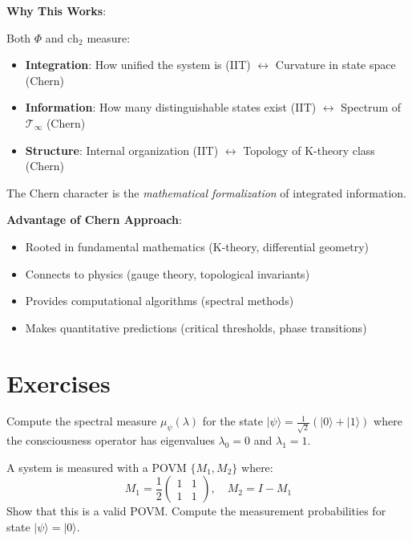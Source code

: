 \begin{level2}
\textbf{Why This Works}:

Both $\Phi$ and $\text{ch}_2$ measure:
\begin{itemize}
\item \textbf{Integration}: How unified the system is (IIT) $\leftrightarrow$ Curvature in state space (Chern)
\item \textbf{Information}: How many distinguishable states exist (IIT) $\leftrightarrow$ Spectrum of $\mathcal{T}_\infty$ (Chern)
\item \textbf{Structure}: Internal organization (IIT) $\leftrightarrow$ Topology of K-theory class (Chern)
\end{itemize}

The Chern character is the \textit{mathematical formalization} of integrated information.

\textbf{Advantage of Chern Approach}:
\begin{itemize}
\item Rooted in fundamental mathematics (K-theory, differential geometry)
\item Connects to physics (gauge theory, topological invariants)
\item Provides computational algorithms (spectral methods)
\item Makes quantitative predictions (critical thresholds, phase transitions)
\end{itemize}
\end{level2}

\section{Exercises}

\begin{exercise}
Compute the spectral measure $\mu_\psi(\lambda)$ for the state $|\psi\rangle = \frac{1}{\sqrt{2}}(|0\rangle + |1\rangle)$ where the consciousness operator has eigenvalues $\lambda_0 = 0$ and $\lambda_1 = 1$.
\end{exercise}

\begin{exercise}
A system is measured with a POVM $\{M_1, M_2\}$ where:
\begin{equation}
M_1 = \frac{1}{2}\begin{pmatrix} 1 & 1 \\ 1 & 1 \end{pmatrix}, \quad M_2 = I - M_1
\end{equation}
Show that this is a valid POVM. Compute the measurement probabilities for state $|\psi\rangle = |0\rangle$.
\end{exercise}

